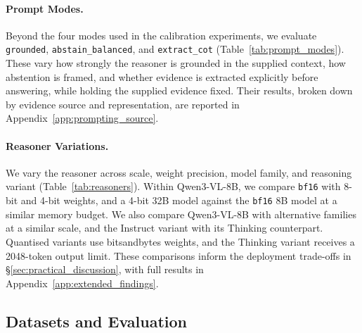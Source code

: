 

\paragraph{Prompt Modes.} Beyond the four modes used in the calibration experiments, we evaluate \texttt{grounded}, \texttt{abstain\_balanced}, and \texttt{extract\_cot} (Table~\ref{tab:prompt_modes}). These vary how strongly the reasoner is grounded in the supplied context, how abstention is framed, and whether evidence is extracted explicitly before answering, while holding the supplied evidence fixed. Their results, broken down by evidence source and representation, are reported in Appendix~\ref{app:prompting_source}.

\paragraph{Reasoner Variations.} We vary the reasoner across scale, weight precision, model family, and reasoning variant (Table~\ref{tab:reasoners}). Within Qwen3-VL-8B, we compare \texttt{bf16} with 8-bit and 4-bit weights, and a 4-bit 32B model against the \texttt{bf16} 8B model at a similar memory budget. We also compare Qwen3-VL-8B with alternative families at a similar scale, and the Instruct variant with its Thinking counterpart. Quantised variants use bitsandbytes weights, and the Thinking variant receives a 2048-token output limit. These comparisons inform the deployment trade-offs in \S\ref{sec:practical_discussion}, with full results in Appendix~\ref{app:extended_findings}.



\subsection{Datasets and Evaluation}
\label{sec:dataset_evaluation}

